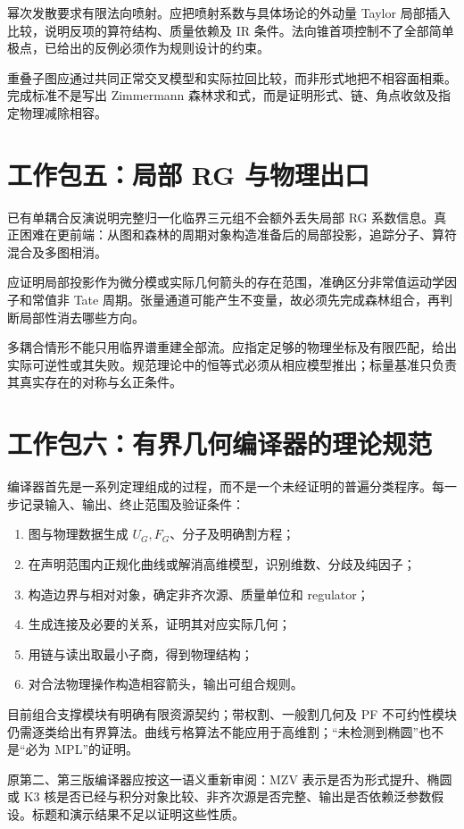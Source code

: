 \documentclass[11pt,a4paper,oneside]{ctexrep}
\theoremstyle{cnplain}
\theoremstyle{definition}
\theoremstyle{remark}
\begin{document}
幂次发散要求有限法向喷射。应把喷射系数与具体场论的外动量 Taylor 局部插入比较，说明反项的算符结构、质量依赖及 IR 条件。法向锥首项控制不了全部简单极点，已给出的反例必须作为规则设计的约束。

重叠子图应通过共同正常交叉模型和实际拉回比较，而非形式地把不相容面相乘。完成标准不是写出 Zimmermann 森林求和式，而是证明形式、链、角点收敛及指定物理减除相容。

\section{工作包五：局部 RG 与物理出口}
已有单耦合反演说明完整归一化临界三元组不会额外丢失局部 RG 系数信息。真正困难在更前端：从图和森林的周期对象构造准备后的局部投影，追踪分子、算符混合及多图相消。

应证明局部投影作为微分模或实际几何箭头的存在范围，准确区分非常值运动学因子和常值非 Tate 周期。张量通道可能产生不变量，故必须先完成森林组合，再判断局部性消去哪些方向。

多耦合情形不能只用临界谱重建全部流。应指定足够的物理坐标及有限匹配，给出实际可逆性或其失败。规范理论中的恒等式必须从相应模型推出；标量基准只负责其真实存在的对称与幺正条件。

\section{工作包六：有界几何编译器的理论规范}
编译器首先是一系列定理组成的过程，而不是一个未经证明的普遍分类程序。每一步记录输入、输出、终止范围及验证条件：
\begin{enumerate}
\item 图与物理数据生成 $U_G,F_G$、分子及明确割方程；
\item 在声明范围内正规化曲线或解消高维模型，识别维数、分歧及纯因子；
\item 构造边界与相对对象，确定非齐次源、质量单位和 regulator；
\item 生成连接及必要的关系，证明其对应实际几何；
\item 用链与读出取最小子商，得到物理结构；
\item 对合法物理操作构造相容箭头，输出可组合规则。
\end{enumerate}
目前组合支撑模块有明确有限资源契约；带权割、一般割几何及 PF 不可约性模块仍需逐类给出有界算法。曲线亏格算法不能应用于高维割；``未检测到椭圆''也不是``必为 MPL''的证明。

原第二、第三版编译器应按这一语义重新审阅：MZV 表示是否为形式提升、椭圆或 K3 核是否已经与积分对象比较、非齐次源是否完整、输出是否依赖泛参数假设。标题和演示结果不足以证明这些性质。
\end{document}
